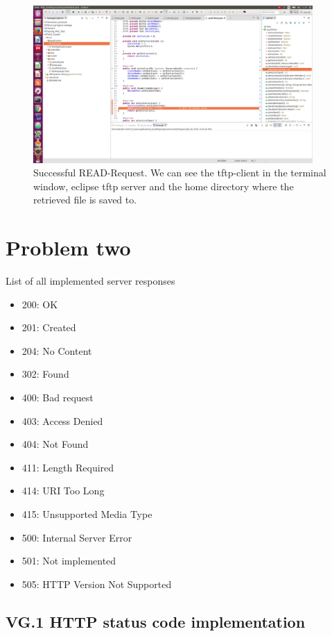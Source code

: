\documentclass[a4paper,12pt]{article}
\numberwithin{figure}{section}
\begin{document}
\begin{figure}[h!]
	\centering
	\includegraphics[width=0.95\textwidth,keepaspectratio]{img/problem1.png} 
	\caption{Successful READ-Request. We can see the tftp-client in the terminal window, eclipse tftp server and the home directory where the retrieved file is saved to.}
	\label{TFTP_READ}
\end{figure}

 

\newpage
\section{Problem two}

List of all implemented server responses
\begin{itemize}
	\item 200: OK
	\item 201: Created
	\item 204: No Content
	\item 302: Found
	\item 400: Bad request
	\item 403: Access Denied
	\item 404: Not Found
	\item 411: Length Required
	\item 414: URI Too Long
	\item 415: Unsupported Media Type
	\item 500: Internal Server Error
	\item 501: Not implemented
	\item 505: HTTP Version Not Supported
\end{itemize}


\newpage
\subsection{VG.1 HTTP status code implementation}
\end{document}
